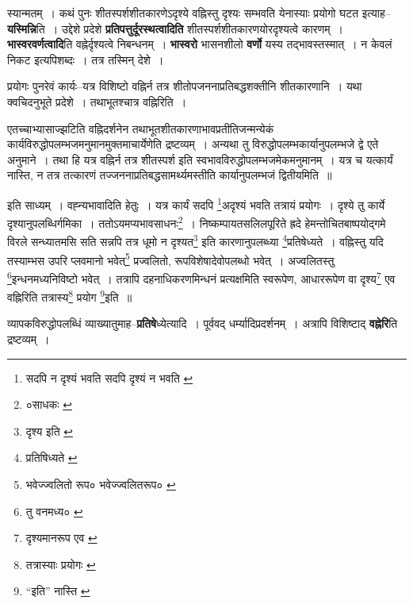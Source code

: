 \documentclass[article,12pt,a4paper]{memoir}
\begin{document}
	  \pstart स्यान्मतम् । कथं पुनः शीतस्पर्शशीतकारणेऽदृश्ये वह्निस्तु दृश्यः सम्भवति येनास्याः प्रयोगो घटत इत्याह--\textbf{यस्मिन्नि}ति । उद्देशे प्रदेशे \textbf{प्रतिपत्तुर्दूरस्थत्वादिति} शीतस्पर्शशीतकारणयोरदृश्यत्वे कारणम् । \textbf{भास्वरवर्णत्वादि}ति वह्नेर्दृश्यत्वे निबन्धनम् । \textbf{भास्वरो} भासनशीलो \textbf{वर्णो} यस्य तद्भावस्तस्मात् । न केवलं निकट इत्यपिशब्दः । तत्र तस्मिन् देशे ।
	\pend
      

	  \pstart प्रयोगः पुनरेवं कार्यः--यत्र विशिष्टो वह्निर्न तत्र शीतोपजननाप्रतिबद्धशक्तीनि शीतकारणानि । यथा क्वचिदनुभूते प्रदेशे । तथाभूतश्चात्र वह्निरिति ।
	\pend
      

	  \pstart एतच्चाभ्यासाज्झटिति वह्निदर्शनेन तथाभूतशीतकारणाभावप्रतीतिजन्मन्येकं कार्यविरुद्धोपलम्भजमनुमानमुक्तमाचार्येणेति द्रष्टव्यम् । अन्यथा तु विरुद्धोपलम्भकार्यानुपलम्भजे द्वे एते अनुमाने । तथा हि यत्र वह्निर्न तत्र शीतस्पर्श इति स्वभावविरुद्धोपलम्भजमेकमनुमानम् । यत्र च यत्कार्यं नास्ति, न तत्र तत्कारणं तज्जननाप्रतिबद्धसामर्थ्यमस्तीति कार्यानुपलम्भजं द्वितीयमिति ॥
	\pend
	  \bigskip
	  \begingroup
	

	  \pstart इति साध्यम् । वह्न्यभावादिति हेतुः । यत्र कार्यं सदपि \footnote{सदपि न दृश्यं भवति \cite{dp-msC} सदपि दृश्यं न भवति \cite{dp-msA} \cite{dp-edP} \cite{dp-edH} \cite{dp-edE} \cite{dp-edN}}\-अदृश्यं भवति तत्रायं प्रयोगः । दृश्ये तु कार्ये दृश्यानुपलब्धिर्गमिका । ततोऽयमप्यभावसाधनः\footnote{०साधकः \cite{dp-msC}} । निष्कम्पायतसलिलपूरिते ह्रदे हेमन्तोचितबाष्पयोद्गमे विरले सन्ध्यातमसि सति सन्नपि तत्र धूमो न दृश्यत\footnote{दृश्य इति \cite{dp-msA} \cite{dp-edP} \cite{dp-edH} \cite{dp-edE} \cite{dp-edN}} इति कारणानुपलब्ध्या \footnote{प्रतिषिध्यते \cite{dp-msB}}\-प्रतिषेध्यते । वह्निस्तु यदि तस्याम्भस उपरि प्लवमानो भवेत्\footnote{भवेज्ज्वलितो रूप० \cite{dp-msA} \cite{dp-edP} \cite{dp-edH} \cite{dp-edN} भवेज्ज्वलितरूप० \cite{dp-edE}} प्रज्वलितो, रूपविशेषादेवोपलब्धो भवेत् । अज्वलितस्तु \footnote{तु वनमध्य० \cite{dp-msB}}\-इन्धनमध्यनिविष्टो भवेत् । तत्रापि दहनाधिकरणमिन्धनं प्रत्यक्षमिति स्वरूपेण, आधाररूपेण वा दृश्य\footnote{दृश्यमानरूप एव \cite{dp-msC}} एव वह्निरिति तत्रास्य\footnote{तत्रास्याः प्रयोगः \cite{dp-msA} \cite{dp-msB} \cite{dp-msC} \cite{dp-msD} \cite{dp-edP} \cite{dp-edH} \cite{dp-edE} \cite{dp-edN}} प्रयोग \footnote{“इति” नास्ति \cite{dp-msA} \cite{dp-msB} \cite{dp-edP} \cite{dp-edH} \cite{dp-edE} \cite{dp-edN}}\-इति ॥
	\pend
      
	  \endgroup
	

	  \pstart व्यापकविरुद्धोपलब्धिं व्याख्यातुमाह--\textbf{प्रतिषे}ध्येत्यादि । पूर्ववद् धर्म्यादिप्रदर्शनम् । अत्रापि विशिष्टाद् \textbf{वह्नेरि}ति द्रष्टव्यम् ।
	\pend
      
\end{document}
